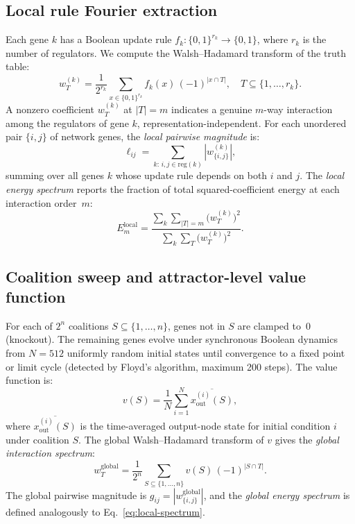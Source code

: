 \documentclass[10pt]{article}
\begin{document}
\subsection{Local rule Fourier extraction}
\label{sec:local-fourier}

Each gene $k$ has a Boolean update rule $f_k\colon \{0,1\}^{r_k}
\to \{0,1\}$, where $r_k$ is the number of regulators. We compute
the Walsh--Hadamard transform of the truth table:
%
\begin{equation}
\label{eq:local-wht}
w_T^{(k)} = \frac{1}{2^{r_k}} \sum_{x \in \{0,1\}^{r_k}} f_k(x)\,(-1)^{|x \cap T|},
\quad T \subseteq \{1, \ldots, r_k\}.
\end{equation}
%
A nonzero coefficient $w_T^{(k)}$ at $|T| = m$ indicates a genuine
$m$-way interaction among the regulators of gene $k$,
representation-independent. For each unordered pair $\{i,j\}$ of
network genes, the \emph{local pairwise magnitude} is:
%
\begin{equation}
\label{eq:local-pair}
\ell_{ij} = \sum_{k:\, i,j \in \mathrm{reg}(k)} |w_{\{i,j\}}^{(k)}|,
\end{equation}
%
summing over all genes $k$ whose update rule depends on both $i$ and
$j$. The \emph{local energy spectrum} reports the fraction of total
squared-coefficient energy at each interaction order~$m$:
%
\begin{equation}
\label{eq:local-spectrum}
E_m^{\mathrm{local}} = \frac{\sum_k \sum_{|T|=m} \bigl(w_T^{(k)}\bigr)^2}
{\sum_k \sum_T \bigl(w_T^{(k)}\bigr)^2}.
\end{equation}


\subsection{Coalition sweep and attractor-level value function}
\label{sec:coalition-sweep}

For each of $2^n$ coalitions $S \subseteq \{1,\ldots,n\}$, genes not
in $S$ are clamped to~0 (knockout). The remaining genes evolve under
synchronous Boolean dynamics from $N = 512$ uniformly random initial
states until convergence to a fixed point or limit cycle (detected by
Floyd's algorithm, maximum 200 steps). The value function is:
%
\begin{equation}
\label{eq:value}
v(S) = \frac{1}{N} \sum_{i=1}^{N}
\overline{x_{\mathrm{out}}^{(i)}(S)},
\end{equation}
%
where $\overline{x_{\mathrm{out}}^{(i)}(S)}$ is the time-averaged
output-node state for initial condition $i$ under coalition $S$. The
global Walsh--Hadamard transform of $v$ gives the \emph{global
interaction spectrum}:
%
\begin{equation}
\label{eq:global-wht}
w_T^{\mathrm{global}} = \frac{1}{2^n} \sum_{S \subseteq \{1,\ldots,n\}}
v(S)\,(-1)^{|S \cap T|}.
\end{equation}
%
The global pairwise magnitude is
$g_{ij} = |w_{\{i,j\}}^{\mathrm{global}}|$, and the
\emph{global energy spectrum} is defined analogously to
Eq.~\ref{eq:local-spectrum}.
\end{document}
